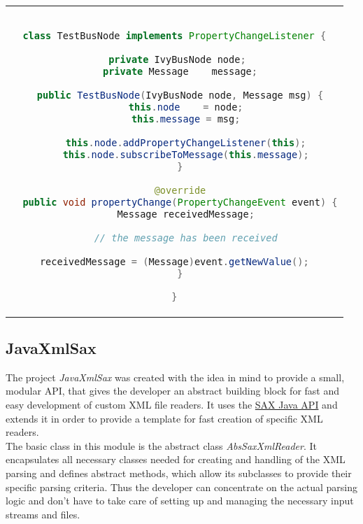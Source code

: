 \begin{center}
\begin{tabular}{c}
\begin{lstlisting}[basicstyle=\small, language=Java]

class TestBusNode implements PropertyChangeListener {
  
  private IvyBusNode node; 
  private Message    message;
  
  public TestBusNode(IvyBusNode node, Message msg) {
    this.node    = node;
    this.message = msg;
    
    this.node.addPropertyChangeListener(this);
    this.node.subscribeToMessage(this.message);
  }
  
  @override
  public void propertyChange(PropertyChangeEvent event) {
    Message receivedMessage;
    
    // the message has been received
        
    receivedMessage = (Message)event.getNewValue();    
  }

}

\end{lstlisting}
\end{tabular}
\end{center}


\subsection{JavaXmlSax}
\label{sec:xmlImplementation}

The project \textit{JavaXmlSax} was created with the idea in mind to provide a small, modular API, that gives the developer an abstract building block for fast and easy development of custom XML file readers. It uses the \href{http://www.saxproject.org/}{SAX Java API} and extends it in order to provide a template for fast creation of specific XML readers.\\
The basic class in this module is the abstract class \textit{AbsSaxXmlReader}. It encapsulates all necessary classes needed for creating and handling of the XML parsing and defines abstract methods, which allow its subclasses to provide their specific parsing criteria. Thus the developer can concentrate on the actual parsing logic and don't have to take care of setting up and managing the necessary input streams and files.\

